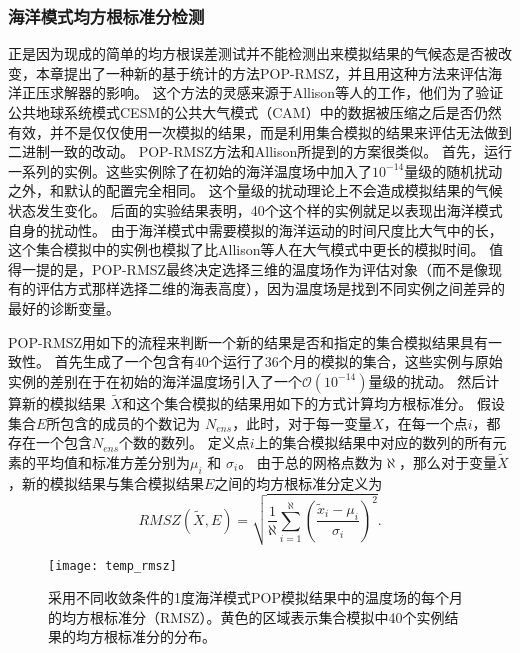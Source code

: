 \subsubsection{海洋模式均方根标准分检测}\label{verify:rmsz}



正是因为现成的简单的均方根误差测试并不能检测出来模拟结果的气候态是否被改变，本章提出了一种新的基于统计的方法POP-RMSZ，并且用这种方法来评估海洋正压求解器的影响。 
这个方法的灵感来源于Allison等人的工作\cite{baker2014methodology}，他们为了验证公共地球系统模式CESM的公共大气模式（CAM）中的数据被压缩之后是否仍然有效，并不是仅仅使用一次模拟的结果，而是利用集合模拟的结果来评估无法做到二进制一致的改动。 
POP-RMSZ方法和Allison所提到的方案很类似\cite{baker2014methodology}。
首先，运行一系列的实例。这些实例除了在初始的海洋温度场中加入了$10^{-14}$量级的随机扰动之外，和默认的配置完全相同。 
这个量级的扰动理论上不会造成模拟结果的气候状态发生变化。 
后面的实验结果表明，40个这个样的实例就足以表现出海洋模式自身的扰动性。
由于海洋模式中需要模拟的海洋运动的时间尺度比大气中的长， 这个集合模拟中的实例也模拟了比Allison等人在大气模式中更长的模拟时间。 
值得一提的是，POP-RMSZ最终决定选择三维的温度场作为评估对象（而不是像现有的评估方式那样选择二维的海表高度），因为温度场是找到不同实例之间差异的最好的诊断变量。 
 
 
POP-RMSZ用如下的流程来判断一个新的结果是否和指定的集合模拟结果具有一致性。 
首先生成了一个包含有40个运行了36个月的模拟的集合，这些实例与原始实例的差别在于在初始的海洋温度场引入了一个$\mathcal{O}(10^{-14})$量级的扰动。 
然后计算新的模拟结果 $\tilde{{X}}$和这个集合模拟的结果用如下的方式计算均方根标准分。 
假设集合$E$所包含的成员的个数记为 $N_{ens}$，此时，对于每一变量$X$，在每一个点$i$，都存在一个包含$N_{ens}$个数的数列。
定义点$i$上的集合模拟结果中对应的数列的所有元素的平均值和标准方差分别为$\mu_i$ 和 $\sigma_i$。 
由于总的网格点数为$\aleph$，那么对于变量$\tilde{{X}}$，新的模拟结果与集合模拟结果$E$之间的均方根标准分定义为
\begin{equation}
 RMSZ(\tilde{X}, E) = \sqrt{\frac{1}{\aleph}\sum_{i=1}^\aleph(\frac{\tilde{x}_i -\mu_i}{\sigma_i})^2}. 
\label{e:rmsz}
\end{equation}


\begin{figure}%
\begin{center}
\texttt{[image: temp\_rmsz]}
\end{center}
\caption[] {采用不同收敛条件的1度海洋模式POP模拟结果中的温度场的每个月的均方根标准分（RMSZ）。黄色的区域表示集合模拟中40个实例结果的均方根标准分的分布。 }
\label{fig:ssh_rmsz_t}
\end{figure}

